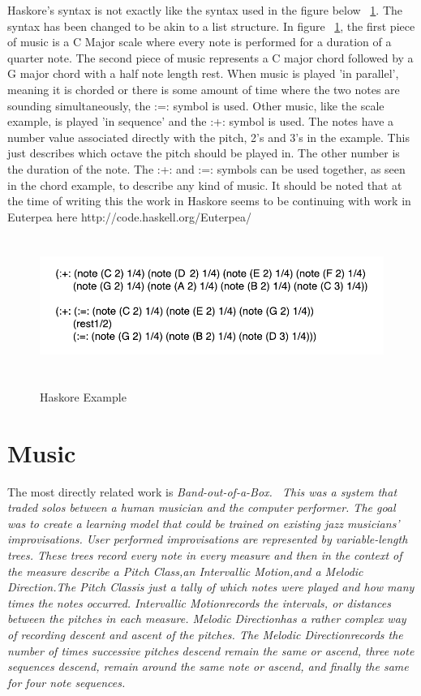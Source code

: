 \documentclass[12pt]{ucthesis}
\newcommand{\captionfonts}{\small\bf\ssp}
\begin{document}
Haskore's syntax is not exactly like the syntax used in the figure below ~\ref{fig:haskore-example}. The syntax has been changed to be akin to a list structure. In figure ~\ref{fig:haskore-example}, the first piece of music is a C Major scale where every note is performed for a duration of a quarter note. The second piece of music represents a C major chord followed by a G major chord with a half note length rest. When music is played 'in parallel', meaning it is chorded or there is some amount of time where the two notes are sounding simultaneously, the :=: symbol is used. Other music, like the scale example, is played 'in sequence' and the :+: symbol is used. The notes have a number value associated directly with the pitch, 2's and 3's in the example. This just describes which octave the pitch should be played in. The other number is the duration of the note. The :+: and :=: symbols can be used together, as seen in the chord example, to describe any kind of music. It should be noted that at the time of writing this the work in Haskore seems to be continuing with work in Euterpea here http://code.haskell.org/Euterpea/

\begin{figure}
\includegraphics[height=45mm]{haskore-example.pdf}
\captionfonts
\caption[Haskore Example]{Haskore Example}
\label{fig:haskore-example}
\end{figure}

\section{Music}
\label{rw:music}
The most directly related work is \em{Band-out-of-a-Box}\em.~\cite{bob} This was a system that traded solos between a human musician and the computer performer. The goal was to create a learning model that could be trained on existing jazz musicians' improvisations. User performed improvisations are represented by variable-length trees. These trees record every note in every measure and then in the context of the measure describe a \em{Pitch Class,}\em an \em{Intervallic Motion,}\em and a \em{Melodic Direction.}\em The \em{Pitch Class}\em is just a tally of which notes were played and how many times the notes occurred. \em{Intervallic Motion}\em records the intervals, or distances between the pitches in each measure.  \em{Melodic Direction}\em has a rather complex way of recording descent and ascent of the pitches.  The \em{Melodic Direction}\em records the number of times successive pitches descend remain the same or ascend, three note sequences descend, remain around the same note or ascend, and finally the same for four note sequences. 
\end{document}
